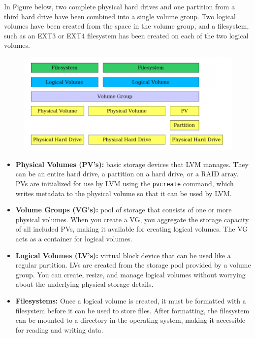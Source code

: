 \documentclass{article}
\begin{document}
In Figure below, two complete physical hard drives and one partition from a third hard drive have been combined into a single volume group. Two logical volumes have been created from the space in the volume group, and a filesystem, such as an EXT3 or EXT4 filesystem has been created on each of the two logical volumes.

\begin{figure}[H]
    \includegraphics[width=\textwidth]{pictures/pvs.png}
    \centering
\end{figure}

\begin{itemize}
    \item \textbf{Physical Volumes (PV's):} basic storage devices that LVM manages. They can be an entire hard drive, a partition on a hard drive, or a RAID array. PVs are initialized for use by LVM using the \verb|pvcreate| command, which writes metadata to the physical volume so that it can be used by LVM.
    \item \textbf{Volume Groups (VG's):} pool of storage that consists of one or more physical volumes. When you create a VG, you aggregate the storage capacity of all included PVs, making it available for creating logical volumes. The VG acts as a container for logical volumes.
    \item \textbf{Logical Volumes (LV's):} virtual block device that can be used like a regular partition. LVs are created from the storage pool provided by a volume group. You can create, resize, and manage logical volumes without worrying about the underlying physical storage details.
    \item \textbf{Filesystems:} Once a logical volume is created, it must be formatted with a filesystem before it can be used to store files. After formatting, the filesystem can be mounted to a directory in the operating system, making it accessible for reading and writing data.
\end{itemize}
\end{document}
